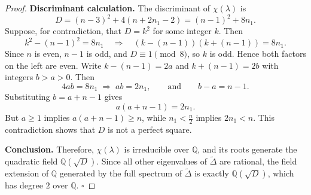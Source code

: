 \documentclass[11pt]{amsart}
\begin{document}
\begin{proof}
\medskip
\noindent\textbf{Discriminant calculation.}
The discriminant of $\chi(\lambda)$ is
\[
D=(n-3)^2+4(n+2n_1-2)
    =(n-1)^2+8n_1.
\]
Suppose, for contradiction, that $D=k^2$ for some integer $k$. Then
\[
k^2-(n-1)^2 = 8n_1 \quad\Longrightarrow\quad (k-(n-1))(k+(n-1)) = 8n_1.
\]
Since $n$ is even, $n-1$ is odd, and $D \equiv 1 \pmod{8}$, so $k$ is odd. Hence both factors on the left are even. Write $k-(n-1)=2a$ and $k+(n-1)=2b$ with integers $b>a>0$. Then
\[
4ab = 8n_1 \;\Rightarrow\; ab = 2n_1, \qquad\text{and}\qquad b-a = n-1.
\]
Substituting $b = a + n - 1$ gives
\[
a(a + n - 1) = 2n_1.
\]
But $a \ge 1$ implies $a(a + n - 1) \ge n$, while $n_1 < \frac{n}{2}$ implies $2n_1 < n$. This contradiction shows that $D$ is not a perfect square.

\medskip
\noindent\textbf{Conclusion.}
Therefore, $\chi(\lambda)$ is irreducible over $\mathbb{Q}$, and its roots generate the quadratic field $\mathbb{Q}(\sqrt{D})$. Since all other eigenvalues of $\widetilde{\Delta}$ are rational, the field extension of $\mathbb{Q}$ generated by the full spectrum of $\widetilde{\Delta}$ is exactly $\mathbb{Q}(\sqrt{D})$, which has degree $2$ over $\mathbb{Q}$. \hfill $\square$
\end{proof}
\end{document}

